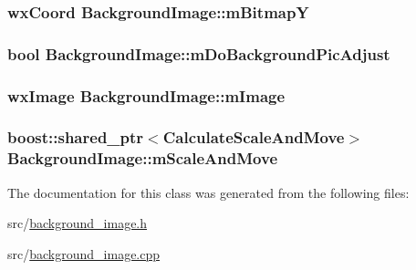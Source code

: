 \hypertarget{a00017_a45f1e5d433635255d53040a31d778b8e}{
\subsubsection[{m\-Bitmap\-Y}]{\setlength{\rightskip}{0pt plus 5cm}wx\-Coord Background\-Image\-::m\-Bitmap\-Y\hspace{0.3cm}{\ttfamily [private]}}}\label{a00017_a45f1e5d433635255d53040a31d778b8e}
\hypertarget{a00017_a3573c3aaaa7cab651194764a97e6beb1}{
\subsubsection[{m\-Do\-Background\-Pic\-Adjust}]{\setlength{\rightskip}{0pt plus 5cm}bool Background\-Image\-::m\-Do\-Background\-Pic\-Adjust\hspace{0.3cm}{\ttfamily [private]}}}\label{a00017_a3573c3aaaa7cab651194764a97e6beb1}
\hypertarget{a00017_a121b7518d160cb9253ca79d44441ab57}{
\subsubsection[{m\-Image}]{\setlength{\rightskip}{0pt plus 5cm}wx\-Image Background\-Image\-::m\-Image\hspace{0.3cm}{\ttfamily [private]}}}\label{a00017_a121b7518d160cb9253ca79d44441ab57}
\hypertarget{a00017_a04635fba985907271247cb8bf1b58bfb}{
\subsubsection[{m\-Scale\-And\-Move}]{\setlength{\rightskip}{0pt plus 5cm}boost\-::shared\-\_\-ptr$<${\bf Calculate\-Scale\-And\-Move}$>$ Background\-Image\-::m\-Scale\-And\-Move\hspace{0.3cm}{\ttfamily [private]}}}\label{a00017_a04635fba985907271247cb8bf1b58bfb}


The documentation for this class was generated from the following files\-:\begin{DoxyCompactItemize}
\item 
src/\hyperlink{a00175}{background\-\_\-image.\-h}\item 
src/\hyperlink{a00174}{background\-\_\-image.\-cpp}\end{DoxyCompactItemize}
